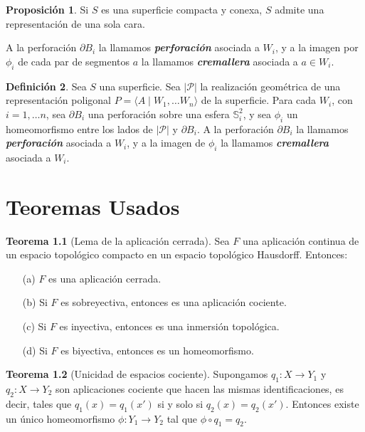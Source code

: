 \documentclass[10pt]{report}
\newcommand{\Esfera}{\mathbb{S}^2}
\newcommand{\enfatiza}[1]{\textbf{\textit{#1}}}
\theoremstyle{definition}
\newtheorem{defin}{Definición}[section]
\newtheorem{tma}[defin]{Teorema}
\newtheorem{prop}[defin]{Proposición}
\begin{document}
\begin{prop}
Si $S$ es una superficie compacta y conexa, $S$ admite una representación de una sola cara.
\end{prop}


A la perforación $\partial B_i$ la llamamos \enfatiza{perforación} asociada a $W_i$, y a la imagen por $\phi _i$ de cada par de segmentos $a$ la llamamos \enfatiza{cremallera} asociada a $a\in W_i$.


\begin{defin}%
Sea $S$ una superficie. Sea $|\mathcal{P}|$ la realización geométrica de una representación poligonal $P=\langle A\mid W_1,\dots W_n\rangle$ de la superficie. Para cada $W_i$, con $i=1,\dots n$, sea $\partial B_i$ una perforación sobre una esfera $\Esfera_i$, y sea $\phi _i$ un homeomorfismo entre los lados de $|\mathcal{P}|$ y $\partial B_i$. A la perforación $\partial B_i$ la llamamos \enfatiza{perforación} asociada a $W_i$, y a la imagen de $\phi _i$ la llamamos \enfatiza{cremallera} asociada a $W_i$.
\end{defin}









\appendix
\chapter{Teoremas Usados}

\begin{tma}[Lema de la aplicación cerrada]
\label{teo:aplicac_cerrada}
Sea $F$ una aplicación continua de un espacio topológico compacto en un espacio topológico Hausdorff. Entonces:
\begin{itemize}
\item[(a)]$F$ es una aplicación cerrada.
\item[(b)] Si $F$ es sobreyectiva, entonces es una aplicación cociente.
\item[(c)] Si $F$ es inyectiva, entonces es una inmersión topológica. %
\item[(d)] Si $F$ es biyectiva, entonces es un homeomorfismo.
\end{itemize}
\end{tma}

\begin{tma}[Unicidad de espacios cociente]
\label{teo:unicidad_espacio_cociente}
Supongamos $q_1:X\to Y_1$ y $q_2:X\to Y_2$ son aplicaciones cociente que hacen las mismas identificaciones, es decir, tales que $q_1(x)=q_1(x')$ si y solo si $q_2(x)=q_2(x')$. Entonces existe un único homeomorfismo $\phi:Y_1\to Y_2$ tal que $\phi \circ q_1=q_2$.
\end{tma}
\end{document}
